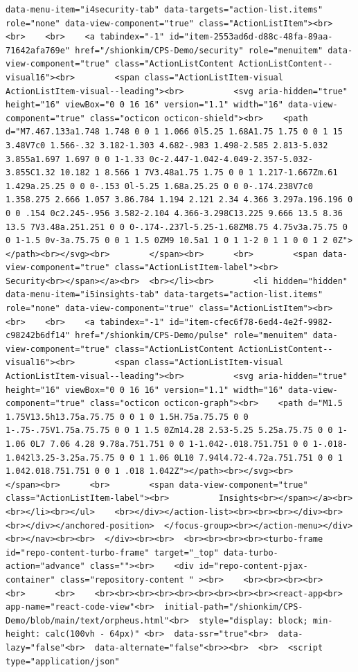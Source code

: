 \documentclass[
  letterpaper,
]{book}
\begin{document}
\begin{verbatim}
data-menu-item="i4security-tab" data-targets="action-list.items" role="none" data-view-component="true" class="ActionListItem"><br>    <br>    <br>    <a tabindex="-1" id="item-2553ad6d-d88c-48fa-89aa-71642afa769e" href="/shionkim/CPS-Demo/security" role="menuitem" data-view-component="true" class="ActionListContent ActionListContent--visual16"><br>        <span class="ActionListItem-visual ActionListItem-visual--leading"><br>          <svg aria-hidden="true" height="16" viewBox="0 0 16 16" version="1.1" width="16" data-view-component="true" class="octicon octicon-shield"><br>    <path d="M7.467.133a1.748 1.748 0 0 1 1.066 0l5.25 1.68A1.75 1.75 0 0 1 15 3.48V7c0 1.566-.32 3.182-1.303 4.682-.983 1.498-2.585 2.813-5.032 3.855a1.697 1.697 0 0 1-1.33 0c-2.447-1.042-4.049-2.357-5.032-3.855C1.32 10.182 1 8.566 1 7V3.48a1.75 1.75 0 0 1 1.217-1.667Zm.61 1.429a.25.25 0 0 0-.153 0l-5.25 1.68a.25.25 0 0 0-.174.238V7c0 1.358.275 2.666 1.057 3.86.784 1.194 2.121 2.34 4.366 3.297a.196.196 0 0 0 .154 0c2.245-.956 3.582-2.104 4.366-3.298C13.225 9.666 13.5 8.36 13.5 7V3.48a.251.251 0 0 0-.174-.237l-5.25-1.68ZM8.75 4.75v3a.75.75 0 0 1-1.5 0v-3a.75.75 0 0 1 1.5 0ZM9 10.5a1 1 0 1 1-2 0 1 1 0 0 1 2 0Z"></path><br></svg><br>        </span><br>      <br>        <span data-view-component="true" class="ActionListItem-label"><br>          Security<br></span></a><br>  <br></li><br>        <li hidden="hidden" data-menu-item="i5insights-tab" data-targets="action-list.items" role="none" data-view-component="true" class="ActionListItem"><br>    <br>    <br>    <a tabindex="-1" id="item-cfec6f78-6ed4-4e2f-9982-c98242b6df14" href="/shionkim/CPS-Demo/pulse" role="menuitem" data-view-component="true" class="ActionListContent ActionListContent--visual16"><br>        <span class="ActionListItem-visual ActionListItem-visual--leading"><br>          <svg aria-hidden="true" height="16" viewBox="0 0 16 16" version="1.1" width="16" data-view-component="true" class="octicon octicon-graph"><br>    <path d="M1.5 1.75V13.5h13.75a.75.75 0 0 1 0 1.5H.75a.75.75 0 0 1-.75-.75V1.75a.75.75 0 0 1 1.5 0Zm14.28 2.53-5.25 5.25a.75.75 0 0 1-1.06 0L7 7.06 4.28 9.78a.751.751 0 0 1-1.042-.018.751.751 0 0 1-.018-1.042l3.25-3.25a.75.75 0 0 1 1.06 0L10 7.94l4.72-4.72a.751.751 0 0 1 1.042.018.751.751 0 0 1 .018 1.042Z"></path><br></svg><br>        </span><br>      <br>        <span data-view-component="true" class="ActionListItem-label"><br>          Insights<br></span></a><br>  <br></li><br></ul>    <br></div></action-list><br><br><br></div><br>      <br></div></anchored-position>  </focus-group><br></action-menu></div><br></nav><br><br>  </div><br><br>  <br><br><br><br><turbo-frame id="repo-content-turbo-frame" target="_top" data-turbo-action="advance" class=""><br>    <div id="repo-content-pjax-container" class="repository-content " ><br>    <br><br><br><br>    <br>      <br>    <br><br><br><br><br><br><br><br><br><react-app<br>  app-name="react-code-view"<br>  initial-path="/shionkim/CPS-Demo/blob/main/text/orpheus.html"<br>  style="display: block; min-height: calc(100vh - 64px)" <br>  data-ssr="true"<br>  data-lazy="false"<br>  data-alternate="false"<br>><br>  <br>  <script type="application/json" 
\end{verbatim}
\end{document}
